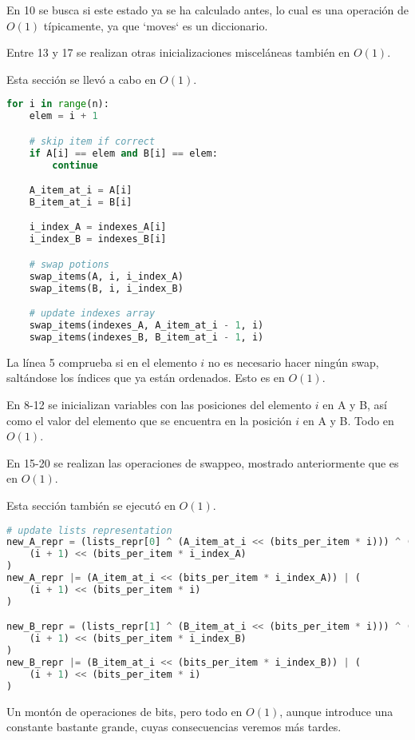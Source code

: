 \documentclass{article}
\begin{document}
En 10 se busca si este estado ya se ha calculado antes, lo cual es una operación de $O(1)$ típicamente, ya que `moves` es un diccionario.

Entre 13 y 17 se realizan otras inicializaciones misceláneas también en $O(1)$.

Esta sección se llevó a cabo en $O(1)$.

\begin{lstlisting}[language=Python]
for i in range(n):
    elem = i + 1

    # skip item if correct
    if A[i] == elem and B[i] == elem:
        continue

    A_item_at_i = A[i]
    B_item_at_i = B[i]

    i_index_A = indexes_A[i]
    i_index_B = indexes_B[i]

    # swap potions
    swap_items(A, i, i_index_A)
    swap_items(B, i, i_index_B)

    # update indexes array
    swap_items(indexes_A, A_item_at_i - 1, i)
    swap_items(indexes_B, B_item_at_i - 1, i)
\end{lstlisting}

La línea 5 comprueba si en el elemento $i$ no es necesario hacer ningún swap, saltándose los índices que ya están ordenados. Esto es en $O(1)$.

En 8-12 se inicializan variables con las posiciones del elemento $i$ en A y B, así como el valor del elemento que se encuentra en la posición $i$ en A y B. Todo en $O(1)$.

En 15-20 se realizan las operaciones de swappeo, mostrado anteriormente que es en $O(1)$.

Esta sección también se ejecutó en $O(1)$.

\begin{lstlisting}[language=Python]
# update lists representation
new_A_repr = (lists_repr[0] ^ (A_item_at_i << (bits_per_item * i))) ^ (
    (i + 1) << (bits_per_item * i_index_A)
)
new_A_repr |= (A_item_at_i << (bits_per_item * i_index_A)) | (
    (i + 1) << (bits_per_item * i)
)

new_B_repr = (lists_repr[1] ^ (B_item_at_i << (bits_per_item * i))) ^ (
    (i + 1) << (bits_per_item * i_index_B)
)
new_B_repr |= (B_item_at_i << (bits_per_item * i_index_B)) | (
    (i + 1) << (bits_per_item * i)
)
\end{lstlisting}

Un montón de operaciones de bits, pero todo en $O(1)$, aunque introduce una constante bastante grande, cuyas consecuencias veremos más tardes.
\end{document}
